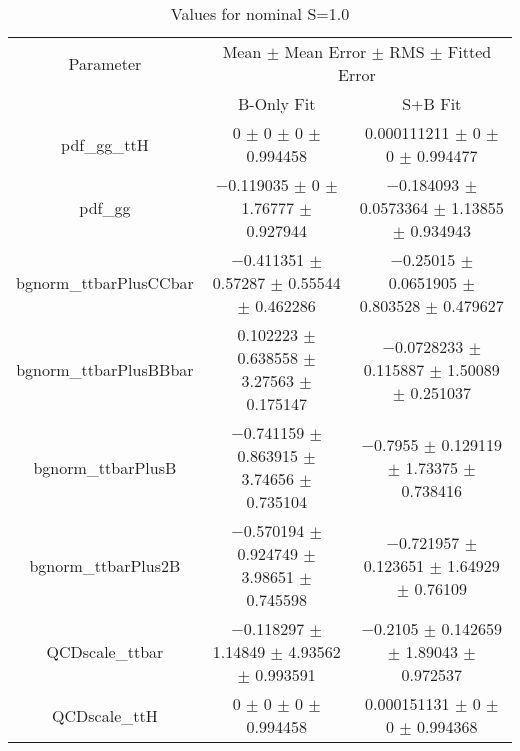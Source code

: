 \begin{table}
\centering
\caption{Values for nominal S=1.0}
\begin{tabular}{ccc}
\toprule
Parameter & \multicolumn{2}{c}{Mean $\pm$ Mean Error $\pm$ RMS $\pm$ Fitted Error}\\
 & B-Only Fit & S+B Fit\\
\midrule
pdf\_gg\_ttH & \num{0} $\pm$ \num{0} $\pm$ \num{0} $\pm$ \num{0.994458} & \num{0.000111211} $\pm$ \num{0} $\pm$ \num{0} $\pm$ \num{0.994477}\\
pdf\_gg & \num{-0.119035} $\pm$ \num{0} $\pm$ \num{1.76777} $\pm$ \num{0.927944} & \num{-0.184093} $\pm$ \num{0.0573364} $\pm$ \num{1.13855} $\pm$ \num{0.934943}\\
bgnorm\_ttbarPlusCCbar & \num{-0.411351} $\pm$ \num{0.57287} $\pm$ \num{0.55544} $\pm$ \num{0.462286} & \num{-0.25015} $\pm$ \num{0.0651905} $\pm$ \num{0.803528} $\pm$ \num{0.479627}\\
bgnorm\_ttbarPlusBBbar & \num{0.102223} $\pm$ \num{0.638558} $\pm$ \num{3.27563} $\pm$ \num{0.175147} & \num{-0.0728233} $\pm$ \num{0.115887} $\pm$ \num{1.50089} $\pm$ \num{0.251037}\\
bgnorm\_ttbarPlusB & \num{-0.741159} $\pm$ \num{0.863915} $\pm$ \num{3.74656} $\pm$ \num{0.735104} & \num{-0.7955} $\pm$ \num{0.129119} $\pm$ \num{1.73375} $\pm$ \num{0.738416}\\
bgnorm\_ttbarPlus2B & \num{-0.570194} $\pm$ \num{0.924749} $\pm$ \num{3.98651} $\pm$ \num{0.745598} & \num{-0.721957} $\pm$ \num{0.123651} $\pm$ \num{1.64929} $\pm$ \num{0.76109}\\
QCDscale\_ttbar & \num{-0.118297} $\pm$ \num{1.14849} $\pm$ \num{4.93562} $\pm$ \num{0.993591} & \num{-0.2105} $\pm$ \num{0.142659} $\pm$ \num{1.89043} $\pm$ \num{0.972537}\\
QCDscale\_ttH & \num{0} $\pm$ \num{0} $\pm$ \num{0} $\pm$ \num{0.994458} & \num{0.000151131} $\pm$ \num{0} $\pm$ \num{0} $\pm$ \num{0.994368}\\
\bottomrule
\end{tabular}
\end{table}